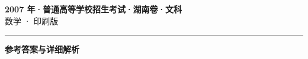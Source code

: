 \documentclass[zihao=5, a4paper]{ctexart}
\begin{document}
\begin{center}
  {\Large\bfseries 2007 年·普通高等学校招生考试·湖南卷·文科}\\[4pt]
  {\large 数学 · 印刷版}
\end{center}
\medskip
{}

\par\bigskip\hrule\bigskip
{}
\begin{center}{\large\bfseries 参考答案与详细解析}\end{center}
\smallskip

\end{document}
